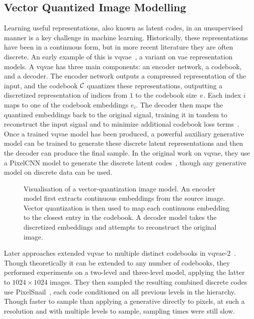 \subsection{Vector Quantized Image Modelling}
\label{subsec:vqmodelling}
Learning useful representations, also known as latent codes, in an unsupervised
manner is a key challenge in machine learning. Historically, these
representations have been in a continuous form, but in more recent literature
they are often discrete. An early example of this is
\gls{vqvae}~\cite{oord2017vqvae}, a variant on \gls{vae} representation models.
A \gls{vqvae} has three main components: an encoder network, a codebook, and a
decoder. The encoder network outputs a compressed representation of the input,
and the codebook $\mathcal{C}$ quantizes these representations, outputting a
discretized representation of indices from $1$ to the codebook size
$v$. Each index $i$ maps to one of the codebook embeddings $e_i$.
The decoder then maps the quantized embeddings back to the original signal,
training it in tandem to reconstruct the input signal and to minimize additional
codebook loss terms~\cite{oord2017vqvae}. Once a trained \gls{vqvae} model has
been produced, a powerful auxiliary generative model can be trained to generate
these discrete latent representations and then the decoder can produce the final
sample. In the original work on \gls{vqvae}, they use a PixelCNN model to
generate the discrete latent codes~\cite{oord2017vqvae}, though any generative
model on discrete data can be used.

\begin{figure}
    \centering
    
    \caption{
        Visualisation of a vector-quantization image model. An encoder model
        first extracts continuous embeddings from the source image. Vector
        quantization is then used to map each continuous embedding to the
        closest entry in the codebook. A decoder model takes the discretized
        embeddings and attempts to reconstruct the original image.
    }
\end{figure}

Later approaches extended \gls{vqvae} to multiple distinct codebooks in
\acrshort{vqvae}-2~\cite{razavi2019generating}. Though theoretically it can be
extended to any number of codebooks, they performed experiments on a two-level
and three-level model, applying the latter to $1024 \times 1024$ images. They
then sampled the resulting combined discrete codes use
PixelSnail~\cite{chen2017snail}, each code conditioned on all previous levels in
the hierarchy. Though faster to sample than applying a generative directly to
pixels, at such a resolution and with multiple levels to sample, sampling times
were still slow.

